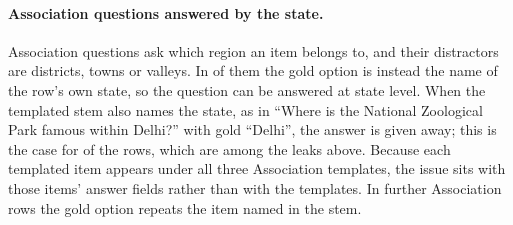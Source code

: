 \paragraph{Association questions answered by the state.}
Association questions ask which region an item belongs to, and their distractors are districts, towns or valleys.
In \nAssocState{} of them the gold option is instead the name of the row's own state, so the question can be answered at state level.
When the templated stem also names the state, as in ``Where is the National Zoological Park famous within Delhi?'' with gold ``Delhi'', the answer is given away; this is the case for \nAssocStateLeak{} of the \nAssocState{} rows, which are among the leaks above.
Because each templated item appears under all three Association templates, the issue sits with those items' answer fields rather than with the templates.
In \nAssocRepeat{} further Association rows the gold option repeats the item named in the stem.
